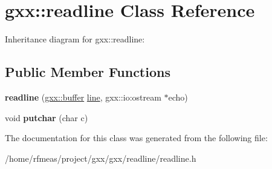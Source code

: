 \hypertarget{classgxx_1_1readline}{}\section{gxx\+:\+:readline Class Reference}
\label{classgxx_1_1readline}


Inheritance diagram for gxx\+:\+:readline\+:
\subsection*{Public Member Functions}
\begin{DoxyCompactItemize}
\item 
{\bfseries readline} (\hyperlink{classgxx_1_1buffer}{gxx\+::buffer} \hyperlink{classgxx_1_1line}{line}, gxx\+::io\+:ostream $\ast$echo)\hypertarget{classgxx_1_1readline_a652a883d3e5ec482ad403aaa12a0c621}{}\label{classgxx_1_1readline_a652a883d3e5ec482ad403aaa12a0c621}

\item 
void {\bfseries putchar} (char c)\hypertarget{classgxx_1_1readline_a4cb847758839e20b3b5b8430139ea714}{}\label{classgxx_1_1readline_a4cb847758839e20b3b5b8430139ea714}

\end{DoxyCompactItemize}


The documentation for this class was generated from the following file\+:\begin{DoxyCompactItemize}
\item 
/home/rfmeas/project/gxx/gxx/readline/readline.\+h\end{DoxyCompactItemize}
